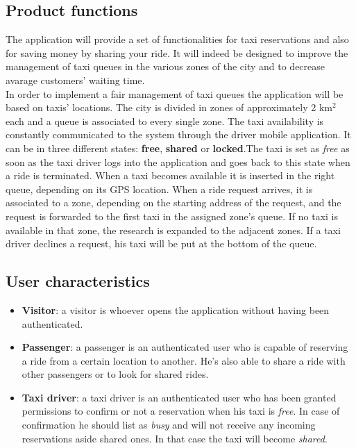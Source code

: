 \documentclass{article}
\begin{document}
\subsection{Product functions}
The application will provide a set of functionalities for taxi reservations and also for saving money by sharing your ride. It will indeed be designed to improve the management of taxi queues in the various zones of the city and to decrease avarage customers' waiting time.\\
In order to implement a fair management of taxi queues the application will be based on taxis' locations.
The city is divided in zones of approximately 2 km$^2$ each and a queue is associated to every single zone.
The taxi availability is constantly communicated to the system through the driver mobile application. It can be in three different states: \textbf{free}, \textbf{shared} or \textbf{locked}.The taxi is set as \textit{free} as soon as the taxi driver logs into the application and goes back to this state when a ride is terminated.
When a taxi becomes available it is inserted in the right queue, depending on its GPS location.
When a ride request arrives, it is associated to a zone, depending on the starting address of the request, and the request is forwarded to the first taxi in the assigned zone's queue. If no taxi is available in that zone, the research is expanded to the adjacent zones.
If a taxi driver declines a request, his taxi will be put at the bottom of the queue.


\subsection{User characteristics}
\begin{itemize}
\item \textbf{Visitor}: a visitor is whoever opens the application without having been authenticated.
\item \textbf{Passenger}: a passenger is an authenticated user who is capable of reserving a ride from a certain location to another. He's also able to share a ride with other passengers or to look for shared rides.
\item \textbf{Taxi driver}: a taxi driver is an authenticated user who has been granted permissions to confirm or not a reservation when his taxi is \textit{free}. In case of confirmation he should list as \textit{busy} and will not receive any incoming reservations aside shared ones. In that case the taxi will become \textit{shared}.
\end{itemize}
\end{document}
